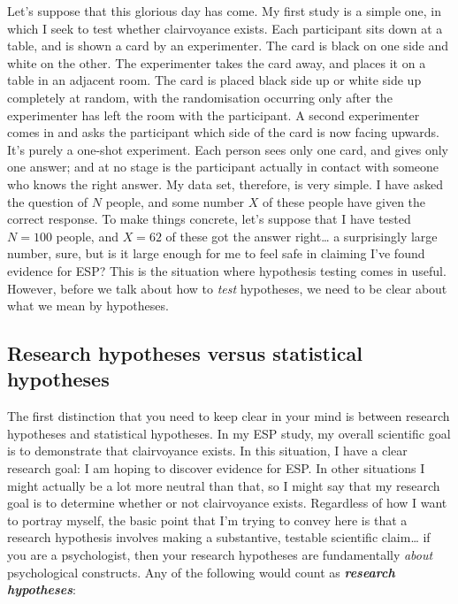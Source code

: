 \documentclass[
]{book}
\begin{document}
Let's suppose that this glorious day has come. My first study is a simple one, in which I seek to test whether clairvoyance exists. Each participant sits down at a table, and is shown a card by an experimenter. The card is black on one side and white on the other. The experimenter takes the card away, and places it on a table in an adjacent room. The card is placed black side up or white side up completely at random, with the randomisation occurring only after the experimenter has left the room with the participant. A second experimenter comes in and asks the participant which side of the card is now facing upwards. It's purely a one-shot experiment. Each person sees only one card, and gives only one answer; and at no stage is the participant actually in contact with someone who knows the right answer. My data set, therefore, is very simple. I have asked the question of \(N\) people, and some number \(X\) of these people have given the correct response. To make things concrete, let's suppose that I have tested \(N = 100\) people, and \(X = 62\) of these got the answer right\ldots{} a surprisingly large number, sure, but is it large enough for me to feel safe in claiming I've found evidence for ESP? This is the situation where hypothesis testing comes in useful. However, before we talk about how to \emph{test} hypotheses, we need to be clear about what we mean by hypotheses.

\hypertarget{research-hypotheses-versus-statistical-hypotheses}{%
\subsection{Research hypotheses versus statistical hypotheses}\label{research-hypotheses-versus-statistical-hypotheses}}

The first distinction that you need to keep clear in your mind is between research hypotheses and statistical hypotheses. In my ESP study, my overall scientific goal is to demonstrate that clairvoyance exists. In this situation, I have a clear research goal: I am hoping to discover evidence for ESP. In other situations I might actually be a lot more neutral than that, so I might say that my research goal is to determine whether or not clairvoyance exists. Regardless of how I want to portray myself, the basic point that I'm trying to convey here is that a research hypothesis involves making a substantive, testable scientific claim\ldots{} if you are a psychologist, then your research hypotheses are fundamentally \emph{about} psychological constructs. Any of the following would count as \textbf{\emph{research hypotheses}}:
\end{document}
